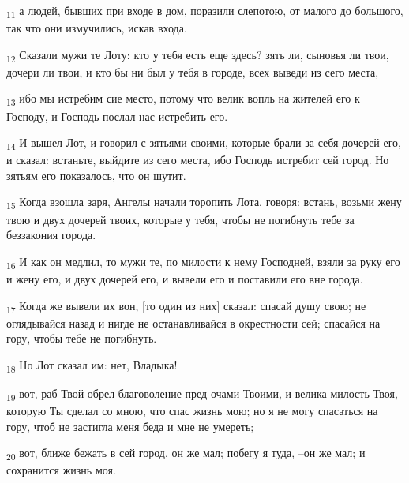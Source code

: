 \begin{tcolorbox}
\textsubscript{11} а людей, бывших при входе в дом, поразили слепотою, от малого до большого, так что они измучились, искав входа.
\end{tcolorbox}
\begin{tcolorbox}
\textsubscript{12} Сказали мужи те Лоту: кто у тебя есть еще здесь? зять ли, сыновья ли твои, дочери ли твои, и кто бы ни был у тебя в городе, всех выведи из сего места,
\end{tcolorbox}
\begin{tcolorbox}
\textsubscript{13} ибо мы истребим сие место, потому что велик вопль на жителей его к Господу, и Господь послал нас истребить его.
\end{tcolorbox}
\begin{tcolorbox}
\textsubscript{14} И вышел Лот, и говорил с зятьями своими, которые брали за себя дочерей его, и сказал: встаньте, выйдите из сего места, ибо Господь истребит сей город. Но зятьям его показалось, что он шутит.
\end{tcolorbox}
\begin{tcolorbox}
\textsubscript{15} Когда взошла заря, Ангелы начали торопить Лота, говоря: встань, возьми жену твою и двух дочерей твоих, которые у тебя, чтобы не погибнуть тебе за беззакония города.
\end{tcolorbox}
\begin{tcolorbox}
\textsubscript{16} И как он медлил, то мужи те, по милости к нему Господней, взяли за руку его и жену его, и двух дочерей его, и вывели его и поставили его вне города.
\end{tcolorbox}
\begin{tcolorbox}
\textsubscript{17} Когда же вывели их вон, [то один из них] сказал: спасай душу свою; не оглядывайся назад и нигде не останавливайся в окрестности сей; спасайся на гору, чтобы тебе не погибнуть.
\end{tcolorbox}
\begin{tcolorbox}
\textsubscript{18} Но Лот сказал им: нет, Владыка!
\end{tcolorbox}
\begin{tcolorbox}
\textsubscript{19} вот, раб Твой обрел благоволение пред очами Твоими, и велика милость Твоя, которую Ты сделал со мною, что спас жизнь мою; но я не могу спасаться на гору, чтоб не застигла меня беда и мне не умереть;
\end{tcolorbox}
\begin{tcolorbox}
\textsubscript{20} вот, ближе бежать в сей город, он же мал; побегу я туда, --он же мал; и сохранится жизнь моя.
\end{tcolorbox}
